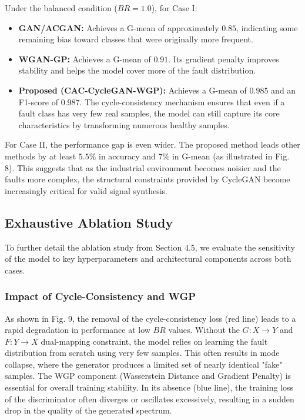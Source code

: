 Under the balanced condition ($BR=1.0$), for Case I:
\begin{itemize}
    \item \textbf{GAN/ACGAN:} Achieves a G-mean of approximately $0.85$, indicating some remaining bias toward classes that were originally more frequent.
    \item \textbf{WGAN-GP:} Achieves a G-mean of $0.91$. Its gradient penalty improves stability and helps the model cover more of the fault distribution.
    \item \textbf{Proposed (CAC-CycleGAN-WGP):} Achieves a G-mean of $0.985$ and an F1-score of $0.987$. The cycle-consistency mechanism ensures that even if a fault class has very few real samples, the model can still capture its core characteristics by transforming numerous healthy samples.
\end{itemize}

For Case II, the performance gap is even wider. The proposed method leads other methods by at least $5.5\%$ in accuracy and $7\%$ in G-mean (as illustrated in Fig. 8). This suggests that as the industrial environment becomes noisier and the faults more complex, the structural constraints provided by CycleGAN become increasingly critical for valid signal synthesis.

\subsection{Exhaustive Ablation Study}
To further detail the ablation study from Section 4.5, we evaluate the sensitivity of the model to key hyperparameters and architectural components across both cases.

\subsubsection{Impact of Cycle-Consistency and WGP}
As shown in Fig. 9, the removal of the cycle-consistency loss (red line) leads to a rapid degradation in performance at low $BR$ values. Without the $G: X \to Y$ and $F: Y \to X$ dual-mapping constraint, the model relies on learning the fault distribution from scratch using very few samples. This often results in mode collapse, where the generator produces a limited set of nearly identical "fake" samples. The WGP component (Wasserstein Distance and Gradient Penalty) is essential for overall training stability. In its absence (blue line), the training loss of the discriminator often diverges or oscillates excessively, resulting in a sudden drop in the quality of the generated spectrum.

